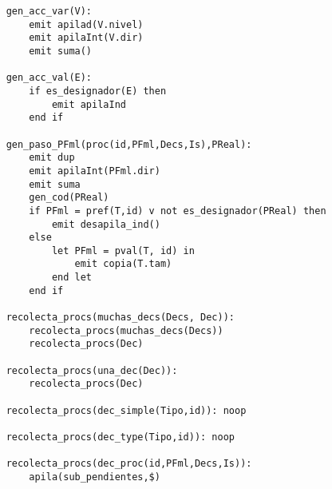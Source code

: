 \begin{lstlisting}
    gen_acc_var(V):
        emit apilad(V.nivel)
        emit apilaInt(V.dir)
        emit suma()
       
    gen_acc_val(E):
        if es_designador(E) then
            emit apilaInd
        end if
    
    gen_paso_PFml(proc(id,PFml,Decs,Is),PReal):
        emit dup
        emit apilaInt(PFml.dir)
        emit suma
        gen_cod(PReal)
        if PFml = pref(T,id) v not es_designador(PReal) then
            emit desapila_ind()
        else
            let PFml = pval(T, id) in
                emit copia(T.tam)
            end let
        end if
        
    recolecta_procs(muchas_decs(Decs, Dec)):
        recolecta_procs(muchas_decs(Decs))
        recolecta_procs(Dec)
    
    recolecta_procs(una_dec(Dec)):
        recolecta_procs(Dec)

    recolecta_procs(dec_simple(Tipo,id)): noop

    recolecta_procs(dec_type(Tipo,id)): noop

    recolecta_procs(dec_proc(id,PFml,Decs,Is)): 
        apila(sub_pendientes,$)

\end{lstlisting}
